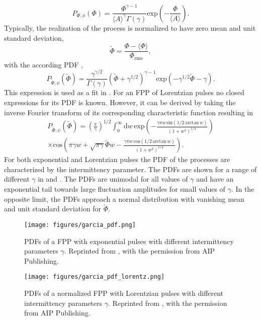 \begin{equation}
	P_{\Phi,\phi}(\Phi) = \frac{\Phi^{\gamma-1}}{\langle A\rangle^\gamma \Gamma(\gamma)}\mathrm{exp}\left(-\frac{\Phi}{\langle A\rangle}\right).
\end{equation}
Typically, the realization of the process is normalized to have zero mean and unit standard deviation,
\begin{equation}\label{norm}
	\widetilde{\Phi} = \frac{\Phi - \langle\Phi\rangle}{\Phi_{\mathrm{rms}}},
\end{equation}
with the according PDF \cite{theodorsen2018probability},
\begin{equation}
	P_{\widetilde{\Phi},\phi}(\widetilde{\Phi}) = \frac{\gamma^{\gamma/2}}{\Gamma(\gamma)}\left(\widetilde{\Phi} + \gamma^{1/2} \right)^{\gamma-1}\mathrm{exp}\left(-\gamma^{1/2}\widetilde{\Phi} - \gamma\right).
\end{equation}
This expression is used as a fit in . For an FPP of Lorentzian pulses no closed expressions for its PDF is known. However, it can be derived by taking the inverse Fourier transform of its corresponding characteristic function resulting in \cite{garcia2018lorentz}
\begin{equation}
	\begin{split}
	P_{\widetilde{\Phi},\psi}(\widetilde{\Phi}) = \left(\frac{\pi}{\gamma}\right)^{1/2}\int_{0}^{\infty}\textrm{d}w\,\mathrm{exp}\left(-\frac{\gamma\pi w\, \mathrm{sin}\left(1/2\, \mathrm{arctan}\, w\right)}{(1+w^2)^{1/4}}\right)\\
	\times \mathrm{cos}\left(\pi\gamma w + \sqrt{\pi\gamma}\widetilde{\Phi}w-\frac{\gamma\pi w\, \mathrm{cos}\left(1/2\, \mathrm{arctan}\, w\right)}{(1+w^2)^{1/4}}\right).
	\end{split}
\end{equation}
For both exponential and Lorentzian pulses the PDF of the processes are characterized by the intermittency parameter. The PDFs are shown for a range of different $\gamma$ in  and . The PDFs are unimodal for all values of $\gamma$ and have an exponential tail towards large fluctuation amplitudes for small values of $\gamma$. In the opposite limit, the PDFs approach a normal distribution with vanishing mean and unit standard deviation for $\widetilde{\Phi}$.

\begin{figure}
	\centering
	\begin{minipage}{.48\linewidth}
		\texttt{[image: figures/garcia\_pdf.png]}
		\caption{PDFs of a FPP with exponential pulses with different intermittency parameters $\gamma$. Reprinted from \cite{garcia2016stochastic}, with the permission from AIP Publishing.}
		\label{Fig:garcia_pdf}
	\end{minipage}
	\hfill
	\begin{minipage}{.48\linewidth}
		\texttt{[image: figures/garcia\_pdf\_lorentz.png]}
		\caption{PDFs of a normalized FPP with Lorentzian pulses with different intermittency parameters $\gamma$. Reprinted from \cite{garcia2018lorentz}, with the permission from AIP Publishing.}
		\label{Fig:garcia_pdf_lorentz}
	\end{minipage}
\end{figure}
